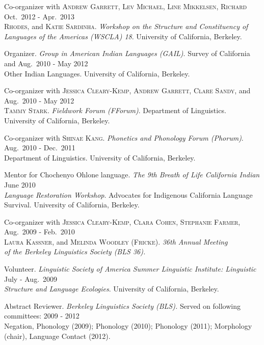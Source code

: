 \documentclass[11pt]{article}
\newcommand{\ca}[1]{\textsc{#1}}
\renewcommand{\it}[1]{\textit{#1}}
\begin{document}
\begin{reflist}
Co-organizer with \ca{Andrew Garrett, Lev Michael, Line Mikkelsen, Richard} \hfill Oct.~2012 - Apr.~2013 \\
\ca{Rhodes,} and \ca{Katie Sardinha}. \it{Workshop on the Structure and Constituency of} \\
\it{Languages of the Americas (WSCLA) 18}. University of California, Berkeley.

Organizer. \it{Group in American Indian Languages (GAIL)}. Survey of California and  \hfill Aug.~2010 - May 2012 \\
Other Indian Languages. University of California, Berkeley.

Co-organizer with \ca{Jessica Cleary-Kemp, Andrew Garrett, Clare Sandy,} and \hfill Aug.~2010 - May 2012 \\
\ca{Tammy Stark}. \it{Fieldwork Forum (FForum)}. Department of Linguistics. \\
University of California, Berkeley.

Co-organizer with \ca{Shinae Kang}. \it{Phonetics and Phonology Forum (Phorum)}. \hfill Aug.~2010 - Dec.~2011 \\
Department of Linguistics. University of California, Berkeley.

Mentor for Chochenyo Ohlone language. \it{The 9th Breath of Life California Indian} \hfill June 2010 \\
\it{Language Restoration Workshop}. Advocates for Indigenous California Language \\
Survival. University of California, Berkeley.
 
Co-organizer with \ca{Jessica Cleary-Kemp, Clara Cohen, Stephanie Farmer,} \hfill Aug.~2009 - Feb.~2010 \\
\ca{Laura Kassner,} and \ca{Melinda Woodley (Fricke)}. \it{36th Annual Meeting} \\
\it{of the Berkeley Linguistics Society (BLS 36).}

Volunteer. \it{Linguistic Society of America Summer Linguistic Institute: Linguistic} \hfill July - Aug.~2009 \\
\it{Structure and Language Ecologies}. University of California, Berkeley.

Abstract Reviewer. \it{Berkeley Linguistics Society (BLS).} Served on following committees: \hfill 2009 - 2012 \\
Negation, Phonology (2009); Phonology (2010); Phonology (2011); Morphology  \\
(chair), Language Contact (2012).


\end{reflist}
\end{document}
